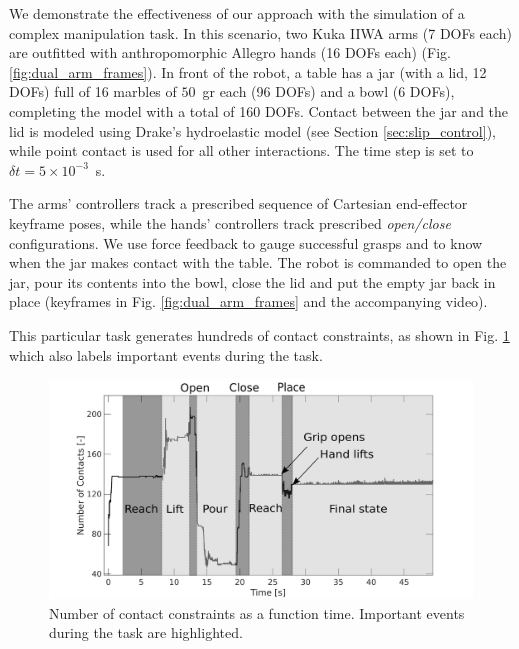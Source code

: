 We demonstrate the effectiveness of our approach with the simulation of a
complex manipulation task. In this scenario, two Kuka IIWA arms (7 DOFs each)
are outfitted with anthropomorphic Allegro hands (16 DOFs each) (Fig.
\ref{fig:dual_arm_frames}). In front of the robot, a table has a jar (with a lid,
12 DOFs) full of 16 marbles of $50$~gr each (96 DOFs) and a bowl (6 DOFs),
completing the model with a total of 160 DOFs. Contact between the jar and the
lid is modeled using Drake's hydroelastic model \cite{bib:elandt2019pressure,
bib:masterjohn2021discrete} (see Section \ref{sec:slip_control}), while point
contact is used for all other interactions. The time step is set to $\delta
t=5\times 10^{-3}$~s.

The arms' controllers track a prescribed sequence of Cartesian end-effector
keyframe poses, while the hands' controllers track prescribed \emph{open/close}
configurations. We use force feedback to gauge successful grasps and to know
when the jar makes contact with the table. The robot is commanded to open the
jar, pour its contents into the bowl, close the lid and put the empty jar back
in place (keyframes in Fig. \ref{fig:dual_arm_frames} and the accompanying
video). 

This particular task generates hundreds of contact constraints, as shown in Fig.
\ref{fig:dual_arm_contacts} which also labels important events during the task.

\begin{figure}[!h]
	\centering
    \includegraphics[width=0.9\columnwidth]{figures/dual_arm/dual_arm_contact.png}
    \caption{\label{fig:dual_arm_contacts} Number of contact constraints as a
    function time. Important events during the task are highlighted.}
\end{figure}

